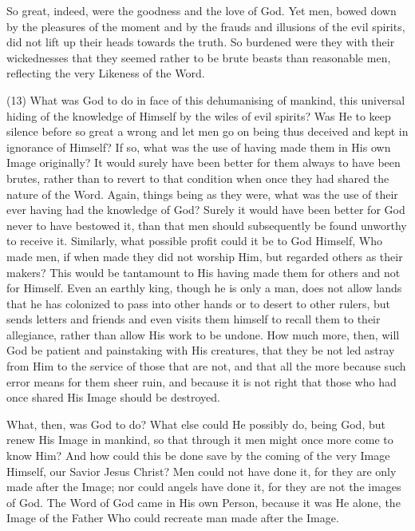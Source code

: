 \documentclass[9pt, twocolumn, oneside, a4paper]{memoir}
\begin{document}
So great, indeed, were the goodness and the love of God. Yet men, bowed down       by the pleasures of the moment and by the frauds and illusions of the evil       spirits, did not lift up their heads towards the truth. So burdened were they       with their wickednesses that they seemed rather to be brute beasts than       reasonable men, reflecting the very Likeness of the Word.   

\textsc{(13)} What was God to do in face of this dehumanising of       mankind, this universal hiding of the knowledge of Himself by the wiles of evil       spirits? Was He to keep silence before so great a wrong and let men go on being       thus deceived and kept in ignorance of Himself? If so, what was the use of       having made them in His own Image originally? It would surely have been better       for them always to have been brutes, rather than to revert to that condition       when once they had shared the nature of the Word. Again, things being as they       were, what was the use of their ever having had the knowledge of God? Surely it       would have been better for God never to have bestowed it, than that men should       subsequently be       found unworthy to receive it. Similarly, what possible profit       could it be to God Himself, Who made men, if when made they did not worship Him,       but regarded others as their makers? This would be tantamount to His having made       them for others and not for Himself. Even an earthly king, though he is only a       man, does not allow lands that he has colonized to pass into other hands or to       desert to other rulers, but sends letters and friends and even visits them       himself to recall them to their allegiance, rather than allow His work to be       undone. How much more, then, will God be patient and painstaking with His       creatures, that they be not led astray from Him to the service of those that are       not, and that all the more because such error means for them sheer ruin, and       because it is not right that those who had once shared His Image should be       destroyed.   

What, then, was God to do? What else could He possibly do, being God, but       renew His Image in mankind, so that through it men might once more come to know       Him? And how could this be done save by the coming of the very Image Himself,       our Savior Jesus Christ? Men could not have done it, for they are only made       after the Image; nor could angels have done it, for they are not the images of       God. The Word of God came in His own Person, because it was He alone, the Image       of the Father Who could recreate man made after the Image.   
\end{document}
